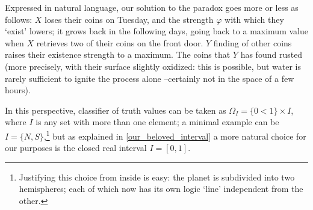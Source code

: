\begin{example}
  Expressed in natural language, our solution to the paradox goes more or less as follows: $X$ loses their coins on Tuesday, and the strength $\varphi$ with which they `exist' lowers; it grows back in the following days, going back to a maximum value when $X$ retrieves two of their coins on the front door. $Y$ finding of other coins raises their existence strength to a maximum. The coins that $Y$ has found rusted (more precisely, with their surface slightly oxidized: this is possible, but water is rarely sufficient to ignite the process alone --certainly not in the space of a few hours).
  \begin{remark}\label{our_beloved_interval}
    In this perspective, \tlon classifier of truth values can be taken as $\Omega_I = \{0<1\}\times I$, where $I$ is any set with more than one element; a minimal example can be $I=\{N,S\}$,\footnote{Justifying this choice from inside \tlon is easy: the planet is subdivided into two hemispheres; each of which now has its own logic `line' independent from the other.} but as explained in \autoref{our_beloved_interval} a more natural choice for our purposes is the closed real interval $I=[0,1]$.


\end{remark}
\end{example}
